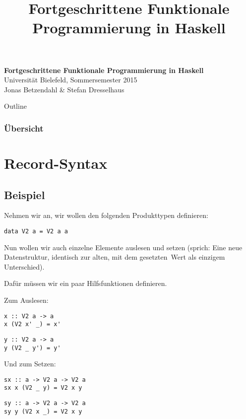 \documentclass{beamer}
\title{Fortgeschrittene Funktionale Programmierung in Haskell}
\begin{document}
  

  \begin{frame}
  \begin{center}
    \huge\textbf{Fortgeschrittene Funktionale Programmierung in Haskell}\\ \bigskip
    \LARGE Universität Bielefeld, Sommersemester 2015\\ \bigskip
    \large Jonas Betzendahl \& Stefan Dresselhaus
    \end{center}
  \end{frame}

\begin{frame}[allowframebreaks]{Outline}
\frametitle{Übersicht}
\tableofcontents[hideallsubsections]
\end{frame}

\section{Record-Syntax}

\subsection{Beispiel}

\begin{frame}[fragile]
Nehmen wir an, wir wollen den folgenden Produkttypen definieren:
\begin{verbatim}
data V2 a = V2 a a
\end{verbatim}
\pause
Nun wollen wir auch einzelne Elemente auslesen und setzen (sprich: Eine neue Datenstruktur, identisch zur alten, mit dem \glqq gesetzten\grqq\ Wert als einzigem Unterschied). \smallskip

Dafür müssen wir ein paar Hilfsfunktionen definieren.
\end{frame}

\begin{frame}[fragile]
Zum Auslesen:
\pause
\begin{verbatim}
x :: V2 a -> a
x (V2 x' _) = x'
\end{verbatim}
\pause
\begin{verbatim}
y :: V2 a -> a
y (V2 _ y') = y'
\end{verbatim}
\pause
\bigskip

Und zum Setzen:
\pause
\begin{verbatim}
sx :: a -> V2 a -> V2 a
sx x (V2 _ y) = V2 x y
\end{verbatim}
\pause
\begin{verbatim}
sy :: a -> V2 a -> V2 a
sy y (V2 x _) = V2 x y
\end{verbatim}
\end{frame}
\end{document}

